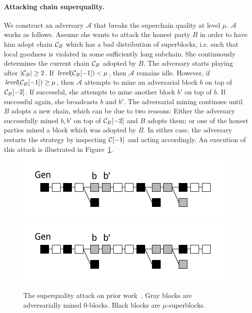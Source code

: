 \paragraph{Attacking chain superquality.}
\label{subsec.superquality-attack}
We construct an adversary $\mathcal{A}$ that breaks the superchain quality at level $\mu$.
$\mathcal{A}$ works as follows. Assume she wants to attack the honest party $B$
in order to have him adopt chain $\mathcal{C}_B$ which has a bad distribution of
superblocks, i.e. such that local goodness is violated in some sufficiently long
subchain. She continuously determines the current chain $\mathcal{C}_B$ adopted by
$B$. The adversary starts playing after $|\mathcal{C}_B| \geq 2$. If
$\textit{level}(\mathcal{C}_B[-1]) < \mu$, then $\mathcal{A}$ remains idle. However,
if $\textit{level}(\mathcal{C}_B[-1]) \geq \mu$, then $\mathcal{A}$ attempts to mine
an adversarial block $b$ on top of $\mathcal{C}_B[-2]$. If successful,  she attempts
to mine another block $b'$ on top of $b$. If successful again, she broadcasts
$b$ and $b'$. The adversarial mining continues until $B$ adopts a new chain,
which can be due to two reasons: Either the adversary successfully mined $b, b'$
on top of $\mathcal{C}_B[-2]$ and $B$ adopts them; or one of the honest parties mined
a block which was adopted by $B$. In either case, the adversary restarts
the strategy by inspecting $\mathcal{C}[-1]$ and acting accordingly. An execution of
this attack is illustrated in Figure~\ref{fig.superquality-attack}.

\begin{figure}
    \caption{The superquality attack on prior work~\cite{popow}.
    Gray blocks are adversarially mined 0-blocks.
    Black blocks are $\mu$-superblocks.}
    \centering
    \iftwocolumn
        \includegraphics[width=\columnwidth,keepaspectratio]{figures/superquality-attack-popow.png}
    \else
        \includegraphics[width=0.5 \columnwidth,keepaspectratio]{figures/superquality-attack-popow.png}
    \fi
    \label{fig.superquality-attack}
\end{figure}

